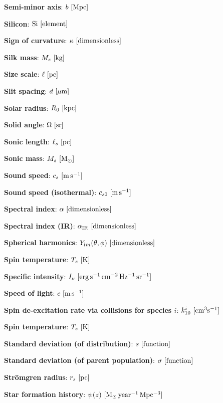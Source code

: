 \documentclass[a4paper,10pt]{article}
\begin{document}
{\noindent}\textbf{Semi-minor axis}: $b ~ [{\rm Mpc}]$

{\noindent}\textbf{Silicon}: ${\rm Si} ~ [{\rm element}]$

{\noindent}\textbf{Sign of curvature}: $\kappa ~ [{\rm dimensionless}]$

{\noindent}\textbf{Silk mass}: $M_s ~ [{\rm kg}]$

{\noindent}\textbf{Size scale}: $\ell ~ [{\rm pc}]$

{\noindent}\textbf{Slit spacing}: $d ~ [{\rm \mu m}]$

{\noindent}\textbf{Solar radius}: $R_0 ~ [{\rm kpc}]$

{\noindent}\textbf{Solid angle}: $\Omega ~ [{\rm sr}]$

{\noindent}\textbf{Sonic length}: $\ell_s ~ [{\rm pc}]$

{\noindent}\textbf{Sonic mass}: $M_s ~ [{\rm M_\odot}]$

{\noindent}\textbf{Sound speed}: $c_s ~ [{\rm m\,s^{-1}}]$

{\noindent}\textbf{Sound speed (isothermal)}: $c_{s0} ~ [{\rm m\,s^{-1}}]$

{\noindent}\textbf{Spectral index}: $\alpha ~ [{\rm dimensionless}]$

{\noindent}\textbf{Spectral index (IR)}: $\alpha_{\rm IR} ~ [{\rm dimensionless}]$

{\noindent}\textbf{Spherical harmonics}: $Y_{lm}(\theta,\phi) ~ [{\rm dimensionless}]$

{\noindent}\textbf{Spin temperature}: $T_s ~ [{\rm K}]$

{\noindent}\textbf{Specific intensity}: $I_\nu ~ [{\rm erg\,s^{-1}\,cm^{-2}\,Hz^{-1}\,sr^{-1}}]$

{\noindent}\textbf{Speed of light}: $c ~ [{\rm m\,s^{-1}}]$

{\noindent}\textbf{Spin de-excitation rate via collisions for species $i$}: $k_{10}^i ~ [{\rm cm^3s^{-1}}]$

{\noindent}\textbf{Spin temperature}: $T_s ~ [{\rm K}]$

{\noindent}\textbf{Standard deviation (of distribution)}: $s ~ [{\rm function}]$

{\noindent}\textbf{Standard deviation (of parent population)}: $\sigma ~ [{\rm function}]$

{\noindent}\textbf{Str\"omgren radius}: $r_s ~ [{\rm pc}]$

{\noindent}\textbf{Star formation history}: $\psi(z) ~ [{\rm M_\odot\,year^{-1}\,Mpc^{-3}}]$
\end{document}
